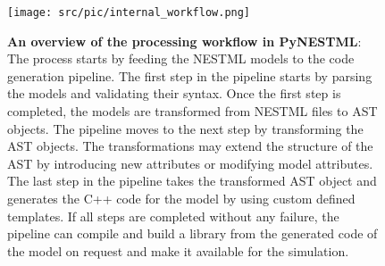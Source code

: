 \begin{figure}[ht!]
\centering
\texttt{[image: src/pic/internal\_workflow.png]}
\caption{\textbf{An overview of the processing workflow in PyNESTML}: The process starts by feeding the NESTML models to the code generation pipeline. The first step in the pipeline starts by parsing the models and validating their syntax. Once the first step is completed, the models are transformed from NESTML files to AST objects. The pipeline moves to the next step by transforming the AST objects. The transformations may extend the structure of the AST by introducing new attributes or modifying model attributes. The last step in the pipeline takes the transformed AST object and generates the C++ code for the model by using custom defined templates. If all steps are completed without any failure, the pipeline can compile and build a library from the generated code of the model on request and make it available for the simulation.}
\label{fig:pynestml_workflow}
\end{figure}


\afterpage{\blankpage}
